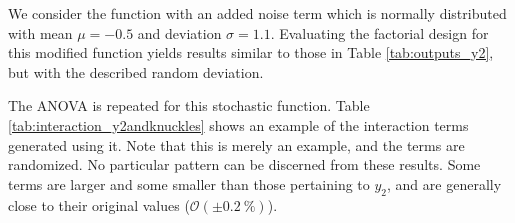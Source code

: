We consider the function with an added noise term which is normally distributed with mean $\mu = -0.5$ and deviation $\sigma = 1.1$. Evaluating the factorial design for this modified function yields results similar to those in Table \ref{tab:outputs_y2}, but with the described random deviation.

The ANOVA is repeated for this stochastic function. Table \ref{tab:interaction_y2andknuckles} shows an example of the interaction terms generated using it. Note that this is merely an example, and the terms are randomized. No particular pattern can be discerned from these results. Some terms are larger and some smaller than those pertaining to $y_2$, and are generally close to their original values ($\mathcal{O}(\pm 0.2\ \%)$).